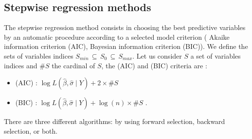 %

\subsection{Stepwise regression methods}

The stepwise regression method consists in choosing the best predictive variables by an automatic procedure
 according to a selected model criterion ( Akaike information criterion (AIC), Bayesian information criterion (BIC)).
We define the sets of variables indices $ S_{min}\,\subseteq\, S_0\,\subseteq\, S_{max}$.
Let us consider $S$ a set of variables indices and $\# S$ the cardinal of $S$, the (AIC) and (BIC) criteria are :

\begin{itemize}
\item (AIC) : $\log L(\hat{\beta},\hat{\sigma}\mid Y) + 2 \times \# S $
\item (BIC) : $\log L(\hat{\beta},\hat{\sigma}\mid Y) + \log(n) \times \# S $ .
\end{itemize}
There are three different algorithms: by using forward selection, backward selection, or both.


